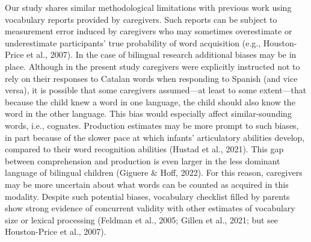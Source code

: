 \documentclass[
  12pt,
  b5paperpaper,
  twoside]{scrreprt}
\begin{document}
Our study shares similar methodological limitations with previous work
using vocabulary reports provided by caregivers. Such reports can be
subject to measurement error induced by caregivers who may sometimes
overestimate or underestimate participants' true probability of word
acquisition (e.g., Houston-Price et al., 2007). In the case of bilingual
research additional biases may be in place. Although in the present
study caregivers were explicitly instructed not to rely on their
responses to Catalan words when responding to Spanish (and vice versa),
it is possible that some caregivers assumed---at least to some
extent---that because the child knew a word in one language, the child
should also know the word in the other language. This bias would
especially affect similar-sounding words, i.e., cognates. Production
estimates may be more prompt to such biases, in part because of the
slower pace at which infants' articulatory abilities develop, compared
to their word recognition abilities (Hustad et al., 2021). This gap
between comprehension and production is even larger in the less dominant
language of bilingual children (Giguere \& Hoff, 2022). For this reason,
caregivers may be more uncertain about what words can be counted as
acquired in this modality. Despite such potential biases, vocabulary
checklist filled by parents show strong evidence of concurrent validity
with other estimates of vocabulary size or lexical processing (Feldman
et al., 2005; Gillen et al., 2021; but see Houston-Price et al., 2007).
\end{document}
